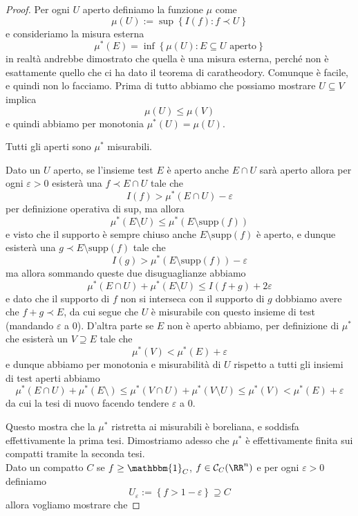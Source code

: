 \documentclass[11pt]{scrartcl}
\begin{document}
	\begin{proof}
		Per ogni $U$ aperto definiamo la funzione $\mu$ come
		$$\mu(U):=\sup\left\{I(f):f\prec U\right\}$$
		e consideriamo la misura esterna 
		$$\mu^*(E)=\inf\left\{\mu(U):E\subseteq U\text{ aperto}\right\}$$
		in realtà andrebbe dimostrato che quella è una misura esterna, perché non è esattamente quello che ci ha dato il teorema di caratheodory. Comunque è facile, e quindi non lo facciamo. Prima di tutto abbiamo che possiamo mostrare $U\subseteq V$ implica
		$$\mu(U)\le \mu(V)$$
		e quindi abbiamo per monotonia $\mu^*(U)=\mu(U)$.
		\begin{claim}
			Tutti gli aperti sono $\mu^*$ misurabili.
		\end{claim}
		\begin{subproof}[Sottodimostrazione]
			Dato un $U$ aperto, se l'insieme test $E$ è aperto anche $E\cap U$ sarà aperto allora per ogni $\varepsilon>0$ esisterà una $f\prec E\cap U$ tale che 
			$$I(f)> \mu^*(E\cap U)-\varepsilon$$
			per definizione operativa di sup, ma allora
			$$\mu^*(E\setminus U)\le \mu^*\left(E\setminus \text{supp}(f)\right)$$
			e visto che il supporto è sempre chiuso anche $E\setminus\text{supp}(f)$ è aperto, e dunque esisterà una $g\prec E\setminus \text{supp}(f)$ tale che
			$$I(g)>\mu^*\left(E\setminus \text{supp}(f)\right)-\varepsilon$$
			ma allora sommando queste due disuguaglianze abbiamo
			$$\mu^*(E\cap U)+\mu^*(E\setminus U)\le I(f+g)+2\varepsilon$$ 
			e dato che il supporto di $f$ non si interseca con il supporto di $g$ dobbiamo avere che $f+g\prec E$, da cui segue che $U$ è misurabile con questo insieme di test (mandando $\varepsilon$ a $0$). D'altra parte se $E$ non è aperto abbiamo, per definizione di $\mu^*$ che esisterà un $V\supseteq E$ tale che 
			$$\mu^*(V)<\mu^*(E)+\varepsilon$$
			e dunque abbiamo per monotonia e misurabilità di $U$ rispetto a tutti gli insiemi di test aperti abbiamo
			$$\mu^*(E\cap U)+\mu^*(E\setminus )\le \mu^*(V\cap U)+\mu^*(V\setminus U)\le \mu^*(V)<\mu^*(E)+\varepsilon$$
			da cui la tesi di nuovo facendo tendere $\varepsilon$ a $0$.
		\end{subproof}
		Questo mostra che la $\mu^*$ ristretta ai misurabili è boreliana, e soddisfa effettivamente la prima tesi. Dimostriamo adesso che $\mu^*$ è effettivamente finita sui compatti tramite la seconda tesi. \\
		Dato un compatto $C$ se $f\ge \mathbbm{1}_C$, $f\in \mathcal{C}_C(\RR^n)$ e per ogni $\varepsilon>0$ definiamo
		$$U_\varepsilon:=\left\{f>1-\varepsilon\right\}\supseteq C$$
		allora vogliamo mostrare che

\end{proof}
\end{document}
